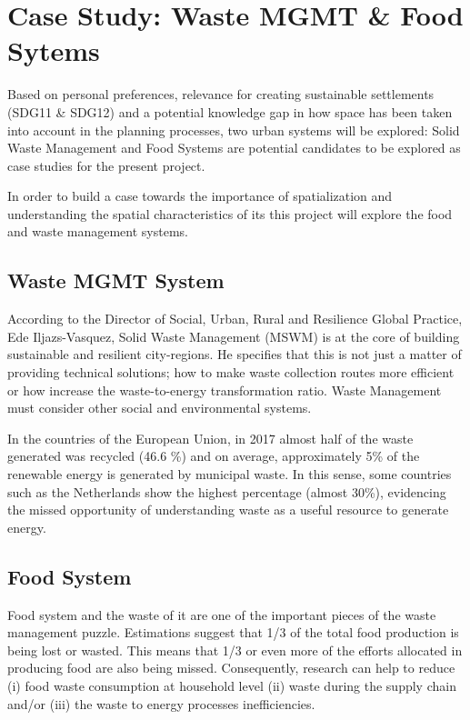 \section{Case Study: Waste MGMT \& Food Sytems}
Based on personal preferences, relevance for creating sustainable settlements (SDG11 \& SDG12) and a potential knowledge gap in how space has been taken into account in the planning processes, two urban systems will be explored: Solid Waste Management and Food Systems are potential candidates to be explored as case studies for the present project. \par

In order to build a case towards the importance of spatialization and understanding the spatial characteristics of its this project will explore the food and waste management systems.   

\subsection{Waste MGMT System}
According to the Director of Social, Urban, Rural and Resilience Global Practice, Ede Iljazs-Vasquez, Solid Waste Management (MSWM) is at the core of building sustainable and resilient city-regions. He specifies that this is not just a matter of providing technical solutions; how to make waste collection routes more efficient or how increase the waste-to-energy transformation ratio. Waste Management must consider other social and environmental systems. \par

In the countries of the European Union, in 2017 almost half of the waste generated was recycled (46.6 \%) and on average, approximately 5\% of the renewable energy is generated by municipal waste. In this sense, some countries such as the Netherlands show the highest percentage (almost 30\%), evidencing the missed opportunity of understanding waste as a useful resource to generate energy. 


\subsection{Food System}
Food system and the waste of it are one of the important pieces of the waste management puzzle. Estimations suggest that 1/3 of the total food production is being lost or wasted. This means that 1/3 or even more of the efforts allocated in producing food are also being missed.  Consequently, research can help to reduce (i) food waste consumption at household level (ii) waste during the supply chain and/or (iii) the waste to energy processes inefficiencies. 


